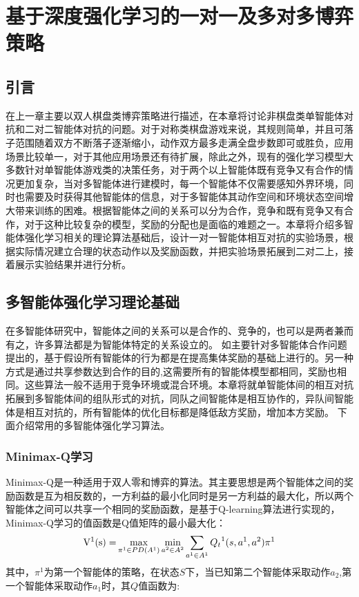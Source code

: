 \chapter{基于深度强化学习的一对一及多对多博弈策略}
\section{引言}
在上一章主要以双人棋盘类博弈策略进行描述，在本章将讨论非棋盘类单智能体对抗和二对二智能体对抗的问题。对于对称类棋盘游戏来说，其规则简单，并且可落子范围随着双方不断落子逐渐缩小，动作双方最多走满全盘步数即可或胜负，应用场景比较单一，对于其他应用场景还有待扩展，除此之外，现有的强化学习模型大多数针对单智能体游戏类的决策任务，对于两个以上智能体既有竞争又有合作的情况更加复杂，当对多智能体进行建模时，每一个智能体不仅需要感知外界环境，同时也需要及时获得其他智能体的信息，对于多智能体其动作空间和环境状态空间增大带来训练的困难。根据智能体之间的关系可以分为合作，竞争和既有竞争又有合作，对于这种比较复杂的模型，奖励的分配也是面临的难题之一。本章将介绍多智能体强化学习相关的理论算法基础后，设计一对一智能体相互对抗的实验场景，根据实际情况建立合理的状态动作以及奖励函数，并把实验场景拓展到二对二上，接着展示实验结果并进行分析。
\section{多智能体强化学习理论基础}
在多智能体研究中，智能体之间的关系可以是合作的、竞争的，也可以是两者兼而有之，许多算法都是为智能体特定的关系设立的。
如\cite{Lazaridou2017Multi}主要针对多智能体合作问题提出的，基于假设所有智能体的行为都是在提高集体奖励的基础上进行的。另一种方式是通过共享参数达到合作的目的\cite{Gupta2017Cooperative},这需要所有的智能体模型都相同，奖励也相同。这些算法一般不适用于竞争环境或混合环境。本章将就单智能体间的相互对抗拓展到多智能体间的组队形式的对抗，同队之间智能体是相互协作的，异队间智能体是相互对抗的，所有智能体的优化目标都是降低敌方奖励，增加本方奖励。
下面介绍常用的多智能体强化学习算法。
\subsection{Minimax-Q学习}
Minimax-Q\cite{Littman1994Markov}是一种适用于双人零和博弈的算法。其主要思想是两个智能体之间的奖励函数是互为相反数的，一方利益的最小化同时是另一方利益的最大化，所以两个智能体之间可以共享一个相同的奖励函数，是基于Q-learning算法进行实现的，Minimax-Q学习的值函数是Q值矩阵的最小最大化：
\begin{equation}
{{\rm{V}}^1}{\rm{(s) = }}\mathop {\max }\limits_{{\pi ^1} \in PD({A^1})} \mathop {\min }\limits_{{a^2} \in {A^2}} \sum\limits_{{a^1} \in {A^1}} {{Q_t}^1(s,{a^1},{a^2})} {\pi ^1}
\end{equation}
其中，${\pi ^1}$为第一个智能体的策略，在状态$S$下，当已知第二个智能体采取动作$a_2$,第一个智能体采取动作$a_1$时，其$Q$值函数为:

